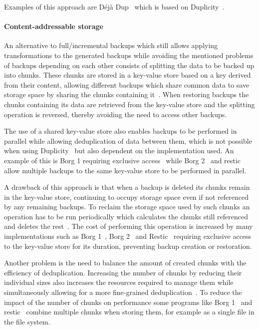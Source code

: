 Examples of this approach are Déjà Dup~\cite{DejaDup} which is based on Duplicity~\cite{Duplicity}.

\paragraph{Content-addressable storage} An alternative to full/incremental backups which
still allows applying transformations to the generated backups while avoiding the mentioned
problems of backups depending on each other consists of splitting the data to be backed up into chunks.
These chunks are stored in a key-value store based on a key derived from their
content, allowing different backups which share common data to save storage space
by sharing the chunks containing it~\cite[section `Internals']{Borg1}.
When restoring backups the chunks containing its data are retrieved from the key-value store
and the splitting operation is reversed, thereby avoiding the need to access other backups.

The use of a shared key-value store also enables backups to be performed in parallel
while allowing deduplication of data between them, which is not possible when using
Duplicity~\cite[question 284867]{DuplicityLaunchpad} but also dependent on the
implementation used.
An example of this is Borg 1 requiring exclusive access~\cite[section `Frequently asked questions']{Borg1}
while Borg 2~\cite[section `Important notes 2.x']{Borg2} and restic~\cite[Issue 4321]{resticGit}
allow multiple backups to the same key-value store to be performed in parallel.

A drawback of this approach is that when a backup is deleted its chunks remain in the
key-value store, continuing to occupy storage space even if not referenced by any remaining backups.
To reclaim the storage space used by such chunks an operation has to be run periodically which
calculates the chunks still referenced and deletes the rest~\cite[section `Usage']{Borg1}.
The cost of performing this operation is increased by many implementations such as
Borg 1~\cite[section `Frequently asked questions']{Borg1},
Borg 2~\cite[section `Important notes 2.x']{Borg2} and
Restic~\cite[section `Removing backup snapshots']{restic} requiring exclusive access
to the key-value store for its duration, preventing backup creation or restoration.

Another problem is the need to balance the amount of created chunks with the
efficiency of deduplication.
Increasing the number of chunks by reducing their individual sizes also increases
the resources required to manage them while simultaneously allowing for a more
fine-grained deduplication~\cite[section `Additional Notes']{Borg1}.
To reduce the impact of the number of chunks on performance some programs
like Borg 1~\cite[section `Internals']{Borg1} and restic~\cite[section `Terminology']{restic}
combine multiple chunks when storing them, for example as a single file in the file system.

